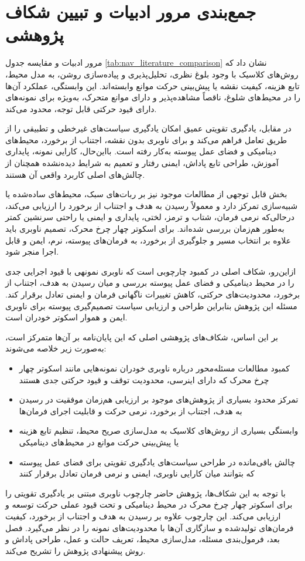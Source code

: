 \section{جمع‌بندی مرور ادبیات و تبیین شکاف پژوهشی}

مرور ادبیات و مقایسه جدول \ref{tab:nav_literature_comparison} نشان داد که روش‌های کلاسیک با وجود بلوغ نظری، تحلیل‌پذیری و پیاده‌سازی روشن، به مدل محیط، تابع هزینه، کیفیت نقشه یا پیش‌بینی حرکت موانع وابسته‌اند. این وابستگی، عملکرد آن‌ها را در محیط‌های شلوغ، ناقصاً مشاهده‌پذیر و دارای موانع متحرک، به‌ویژه برای نمونه‌های دارای قیود حرکتی قابل توجه، محدود می‌کند.

در مقابل، یادگیری تقویتی عمیق امکان یادگیری سیاست‌های غیرخطی و تطبیقی را از طریق تعامل فراهم می‌کند و برای ناوبری بدون نقشه، اجتناب از برخورد، محیط‌های دینامیکی و فضای عمل پیوسته به‌کار رفته است. بااین‌حال، کارایی نمونه، پایداری آموزش، طراحی تابع پاداش، ایمنی رفتار و تعمیم به شرایط دیده‌نشده همچنان از چالش‌های اصلی کاربرد واقعی آن هستند.

بخش قابل توجهی از مطالعات موجود نیز بر ربات‌های سبک، محیط‌های ساده‌شده یا شبیه‌سازی تمرکز دارد و معمولاً رسیدن به هدف و اجتناب از برخورد را ارزیابی می‌کند، درحالی‌که نرمی فرمان، شتاب و ترمز، لختی، پایداری و ایمنی یا راحتی سرنشین کمتر به‌طور هم‌زمان بررسی شده‌اند. برای اسکوتر چهار چرخ محرک، تصمیم ناوبری باید علاوه بر انتخاب مسیر و جلوگیری از برخورد، به فرمان‌های پیوسته، نرم، ایمن و قابل اجرا منجر شود.

ازاین‌رو، شکاف اصلی در کمبود چارچوبی است که ناوبری نمونهی با قیود اجرایی جدی را در محیط دینامیکی و فضای عمل پیوسته بررسی و میان رسیدن به هدف، اجتناب از برخورد، محدودیت‌های حرکتی، کاهش تغییرات ناگهانی فرمان و ایمنی تعادل برقرار کند. مسئله این پژوهش بنابراین طراحی و ارزیابی سیاست تصمیم‌گیری پیوسته برای ناوبری ایمن و هموار اسکوتر خودران است.

بر این اساس، شکاف‌های پژوهشی اصلی که این پایان‌نامه بر آن‌ها متمرکز است، به‌صورت زیر خلاصه می‌شوند:
\begin{itemize}
	\item کمبود مطالعات مسئله‌محور درباره ناوبری خودران نمونه‌هایی مانند اسکوتر چهار چرخ محرک که دارای اینرسی، محدودیت توقف و قیود حرکتی جدی هستند
	\item تمرکز محدود بسیاری از پژوهش‌های موجود بر ارزیابی هم‌زمان موفقیت در رسیدن به هدف، اجتناب از برخورد، نرمی حرکت و قابلیت اجرای فرمان‌ها
	\item وابستگی بسیاری از روش‌های کلاسیک به مدل‌سازی صریح محیط، تنظیم تابع هزینه یا پیش‌بینی حرکت موانع در محیط‌های دینامیکی
	\item چالش باقی‌مانده در طراحی سیاست‌های یادگیری تقویتی برای فضای عمل پیوسته که بتوانند میان کارایی ناوبری، ایمنی و نرمی فرمان تعادل برقرار کنند
\end{itemize}

با توجه به این شکاف‌ها، پژوهش حاضر چارچوب ناوبری مبتنی بر یادگیری تقویتی را برای اسکوتر چهار چرخ محرک در محیط دینامیکی و تحت قیود عملی حرکت توسعه و ارزیابی می‌کند. این چارچوب علاوه بر رسیدن به هدف و اجتناب از برخورد، کیفیت فرمان‌های تولیدشده و سازگاری آن‌ها با محدودیت‌های نمونه را در نظر می‌گیرد. فصل بعد، فرمول‌بندی مسئله، مدل‌سازی محیط، تعریف حالت و عمل، طراحی پاداش و روش پیشنهادی پژوهش را تشریح می‌کند.
